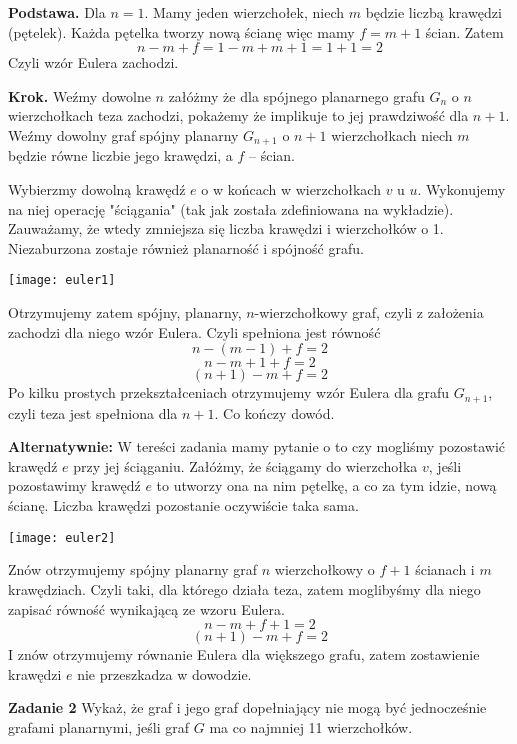 \documentclass[12pt,a4paper]{article}
\begin{document}
\textbf{Podstawa.} Dla \(n = 1\). Mamy jeden wierzchołek, niech \(m\) będzie liczbą krawędzi (pętelek). Każda pętelka tworzy nową ścianę więc mamy \(f = m+1\) ścian. Zatem
\[
	n - m + f = 1 - m + m + 1 = 1 + 1 = 2
\]
Czyli wzór Eulera zachodzi.

\textbf{Krok.} Weźmy dowolne \(n\) załóżmy że dla spójnego planarnego grafu \(G_n\) o \(n\) wierzchołkach teza zachodzi, pokażemy że implikuje to jej prawdziwość dla \(n+1\). Weźmy dowolny graf spójny planarny \(G_{n+1} \) o \(n+1\) wierzchołkach niech \(m\) będzie równe liczbie jego krawędzi, a \(f\) -- ścian.

Wybierzmy dowolną krawędź \(e\) o w końcach w wierzchołkach \(v\) u \(u\). Wykonujemy na niej operację "ściągania" (tak jak została zdefiniowana na wykładzie). Zauważamy, że wtedy zmniejsza się  liczba krawędzi i wierzchołków o 1. Niezaburzona zostaje również planarność i spójność grafu.

\begin{center}
	\texttt{[image: euler1]}
\end{center}

Otrzymujemy zatem spójny, planarny, \(n\)-wierzchołkowy graf, czyli z założenia zachodzi dla niego wzór Eulera. Czyli spełniona jest równość
\[
	n - ( m - 1 ) + f = 2
\]
\[
	n - m + 1 + f = 2
\]
\[
	(n + 1) - m + f = 2
\]
Po kilku prostych przekształceniach otrzymujemy wzór Eulera dla grafu \(G_{n+1}\), czyli teza jest spełniona dla \(n+1\). Co kończy dowód.

\textbf{Alternatywnie:} W tereści zadania mamy pytanie o to czy mogliśmy pozostawić krawędź \(e\) przy jej ściąganiu. Załóżmy, że ściągamy do wierzchołka \(v\), jeśli pozostawimy krawędź \(e\) to utworzy ona na nim pętelkę, a co za tym idzie, nową ścianę. Liczba krawędzi pozostanie oczywiście taka sama.
\begin{center}
	\texttt{[image: euler2]}
\end{center}
Znów otrzymujemy spójny planarny graf \(n\) wierzchołkowy o \(f + 1\) ścianach i \(m\) krawędziach. Czyli taki, dla którego działa teza, zatem moglibyśmy dla niego zapisać równość wynikającą ze wzoru Eulera. 
\[	
	n - m + f + 1 = 2
\]
\[
	(n + 1) - m + f = 2
\]
I znów otrzymujemy równanie Eulera dla większego grafu, zatem zostawienie krawędzi \(e\) nie przeszkadza w dowodzie.

\vskip 1cm
\noindent
\textbf{Zadanie 2} Wykaż, że graf i jego graf dopełniający nie mogą być jednocześnie grafami planarnymi, jeśli graf \(G\) ma co najmniej 11 wierzchołków.
\end{document}
